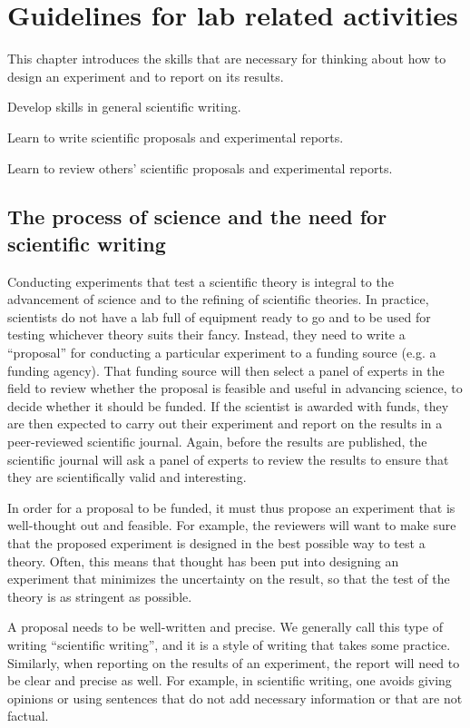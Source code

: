 \chapter{Guidelines for lab related activities}
\label{chapter:labs}
This chapter introduces the skills that are necessary for thinking about how to design an experiment and to report on its results.

\begin{learningObjectives}{
 \item Develop skills in general scientific writing.
 \item Learn to write scientific proposals and experimental reports.
 \item Learn to review others' scientific proposals and experimental reports.
 }
\end{learningObjectives}

\section{The process of science and the need for scientific writing}
Conducting experiments that test a scientific theory is integral to the advancement of science and to the refining of scientific theories. In practice, scientists do not have a lab full of equipment ready to go and to be used for testing whichever theory suits their fancy. Instead, they need to write a ``proposal'' for conducting a particular experiment to a funding source (e.g. a funding agency). That funding source will then select a panel of experts in the field to review whether the proposal is feasible and useful in advancing science, to decide whether it should be funded. If the scientist is awarded with funds, they are then expected to carry out their experiment and report on the results in a peer-reviewed scientific journal. Again, before the results are published, the scientific journal will ask a panel of experts to review the results to ensure that they are scientifically valid and interesting.

In order for a proposal to be funded, it must thus propose an experiment that is well-thought out and feasible. For example, the reviewers will want to make sure that the proposed experiment is designed in the best possible way to test a theory. Often, this means that thought has been put into designing an experiment that minimizes the uncertainty on the result, so that the test of the theory is as stringent as possible.

A proposal needs to be well-written and precise. We generally call this type of writing ``scientific writing'', and it is a style of writing that takes some practice. Similarly, when reporting on the results of an experiment, the report will need to be clear and precise as well. For example, in scientific writing, one avoids giving opinions or using sentences that do not add necessary information or that are not factual.

